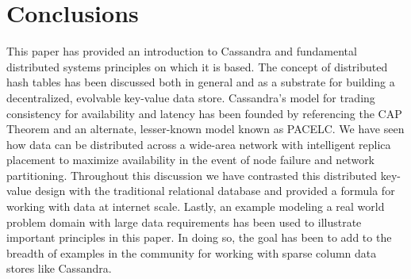 \documentclass[twocolumn]{article}
\begin{document}
\section*{Conclusions}\label{s:conclusion}

This paper has provided an introduction to Cassandra and fundamental distributed systems principles on which it is based.  The concept of distributed hash tables has been discussed both in general and as a substrate for building a decentralized, evolvable key-value data store.  Cassandra's model for trading consistency for availability and latency has been founded by referencing the CAP Theorem and an alternate, lesser-known model known as PACELC.  We have seen how data can be distributed across a wide-area network with intelligent replica placement to maximize availability in the event of node failure and network partitioning.  Throughout this discussion we have contrasted this distributed key-value design with the traditional relational database and provided a formula for working with data at internet scale.  Lastly, an example modeling a real world problem domain with large data requirements has been used to illustrate important principles in this paper.  In doing so, the goal has been to add to the breadth of examples in the community for working with sparse column data stores like Cassandra.

\newpage

\appendix
\end{document}
